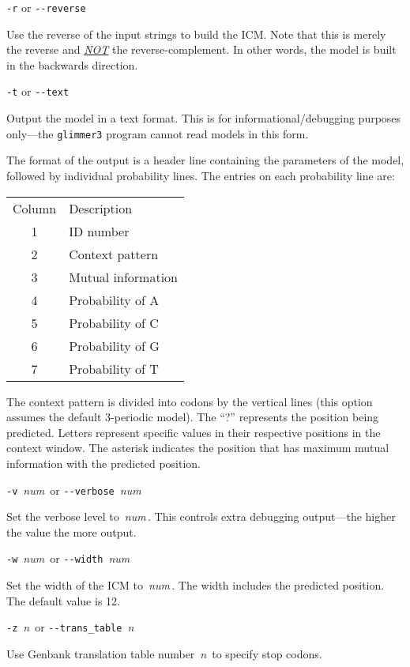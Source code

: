 \documentclass[fleqn,titlepage,11pt]{article}
\def\Desc#1{\,\mbox{\emph{#1}}\,}
\def\Pg#1{\texttt{#1}}
\begin{document}
\exdent
  \verb`-r` \enskip or \enskip \verb`--reverse`

  Use the reverse of the input strings to build the ICM.  Note that
  this is merely the reverse and \emph{\underline{NOT}} the
  reverse-complement.  In other words, the model is built in
  the backwards direction.

\exdent
  \verb`-t` \enskip or \enskip \verb`--text`

  Output the model in a text format.  This is for
  informational/debugging purposes only---the \Pg{glimmer3}
  program cannot read models in this form.

  The format of the output is a header line containing the
  parameters of the model, followed by individual
  probability lines.  The entries on each probability line
  are:
  \bq
    \begin{tabular}{cl}
      Column & \quad Description \\
      1 & ID number \\
      2 & Context pattern \\
      3 & Mutual information \\
      4 & Probability of A \\
      5 & Probability of C \\
      6 & Probability of G \\
      7 & Probability of T
    \end{tabular}
  \eq
  The context pattern is divided into codons by the vertical lines (this
  option assumes the default 3-periodic model).
  The ``?'' represents the position being predicted.  Letters represent
  specific values in their respective positions in the context window.
  The asterisk indicates the position that has maximum mutual information
  with the predicted position.

\exdent
  \verb`-v` \Desc{num} \enskip or \enskip \verb`--verbose` \Desc{num}

  Set the verbose level to \Desc{num}.  This controls extra debugging
  output---the higher the value the more output.

\exdent
  \verb`-w` \Desc{num} \enskip or \enskip \verb`--width` \Desc{num}

  Set the width of the ICM to \Desc{num}.  The width includes
  the predicted position.  The default value is 12.

\exdent
  \verb`-z` \Desc{n} \enskip or \enskip \verb`--trans_table` \Desc{n}

  Use Genbank translation table number \Desc{n} to specify stop codons.
\end{document}
